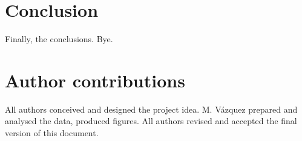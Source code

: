 \documentclass{Resources/netsci-project}
\begin{document}


\clearpage
\section{Conclusion}
Finally, the conclusions. Bye.


\clearpage
\printbibliography

\newpage
\section*{Author contributions}
All authors conceived and designed the project idea. M. Vázquez prepared and analysed the data, produced figures. All authors revised and accepted the final version of this document.

\end{document}
